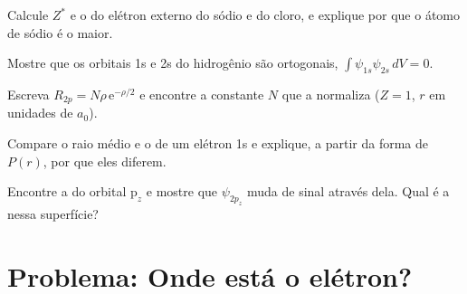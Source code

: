 \begin{exercise}[$\star\star$]\label{exo:b2:atomic-orbitals:8}
Calcule $Z^*$ e o  do elétron externo do sódio e do cloro, e
explique por que o átomo de sódio é o maior.
\end{exercise}

\begin{exercise}[$\star\star$]\label{exo:b2:atomic-orbitals:9}
Mostre que os orbitais 1s e 2s do hidrogênio são ortogonais,
$\int\psi_{1s}\psi_{2s}\,dV = 0$.
\end{exercise}

\begin{exercise}[$\star\star\star$]\label{exo:b2:atomic-orbitals:10}
Escreva $R_{2p} = N\rho\,\mathrm e^{-\rho/2}$ e encontre a constante $N$ que a normaliza
($Z = 1$, $r$ em unidades de $a_0$).
\end{exercise}

\begin{exercise}[$\star\star\star$]\label{exo:b2:atomic-orbitals:11}
Compare o raio médio e o  de um elétron 1s e explique, a
partir da forma de $P(r)$, por que eles diferem.
\end{exercise}

\begin{exercise}[$\star\star\star$]\label{exo:b2:atomic-orbitals:12}
Encontre a  do orbital $\mathrm p_z$ e mostre que $\psi_{2p_z}$
muda de sinal através dela. Qual é a  nessa superfície?
\end{exercise}

\section{Problema: Onde está o elétron?}

